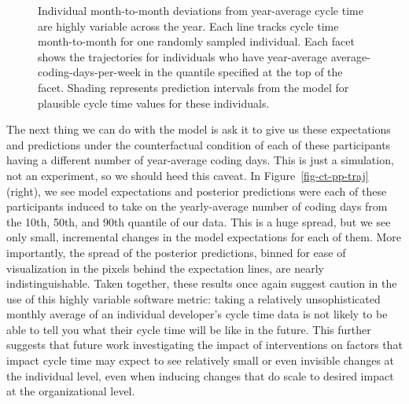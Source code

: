\documentclass[
]{article}
\begin{document}
\begin{figure}[htbp]


\caption[Individual month-to-month deviations from year-average cycle
time are highly variable across the
year]{\label{fig-wi-ct-traj}Individual month-to-month deviations from
year-average cycle time are highly variable across the year. Each line
tracks cycle time month-to-month for one randomly sampled individual.
Each facet shows the trajectories for individuals who have year-average
average-coding-days-per-week in the quantile specified at the top of the
facet. Shading represents prediction intervals from the model for
plausible cycle time values for these individuals.}

\end{figure}%

The next thing we can do with the model is ask it to give us these
expectations and predictions under the counterfactual condition of each
of these participants having a different number of year-average coding
days. This is just a simulation, not an experiment, so we should heed
this caveat. In Figure~\ref{fig-ct-pp-traj} (right), we see model
expectations and posterior predictions were each of these participants
induced to take on the yearly-average number of coding days from the
10th, 50th, and 90th quantile of our data. This is a huge spread, but we
see only small, incremental changes in the model expectations for each
of them. More importantly, the spread of the posterior predictions,
binned for ease of visualization in the pixels behind the expectation
lines, are nearly indistinguishable. Taken together, these results once
again suggest caution in the use of this highly variable software
metric: taking a relatively unsophisticated monthly average of an
individual developer's cycle time data is not likely to be able to tell
you what their cycle time will be like in the future. This further
suggests that future work investigating the impact of interventions on
factors that impact cycle time may expect to see relatively small or
even invisible changes at the individual level, even when inducing
changes that do scale to desired impact at the organizational level.
\end{document}
